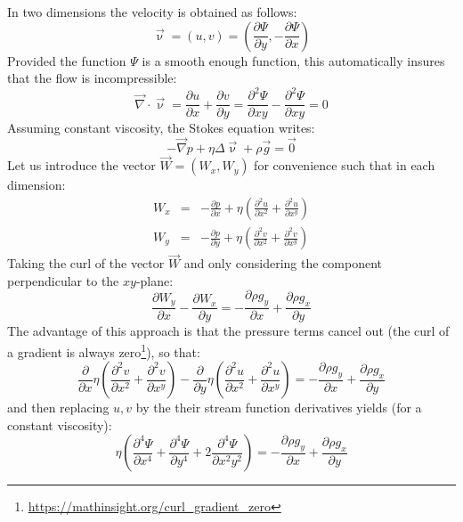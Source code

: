 In two dimensions the velocity is obtained as follows:
\begin{equation}
{\vec \upnu} = (u,v) = \left( \frac{\partial \Psi}{\partial y},-\frac{\partial \Psi}{\partial x} \right) 
\end{equation}
Provided the function $\Psi$ is a smooth enough function, 
this automatically insures that the flow is incompressible:
\begin{equation}
{\vec \nabla}\cdot {\vec \upnu} = 
\frac{\partial u}{\partial x} + \frac{\partial v}{\partial y}
=
\frac{\partial^2 \Psi}{\partial xy} - \frac{\partial^2 \Psi}{\partial xy} =0 
\end{equation}
Assuming constant viscosity, the Stokes equation writes:
\begin{equation}
-{\vec \nabla}p + \eta \Delta {\vec \upnu} + \rho {\vec g} = \vec{0}
\end{equation}
Let us introduce the vector $\vec{W}=(W_x,W_y)$ for convenience such that in each dimension:
\begin{eqnarray}
W_x&=&-\frac{\partial p}{\partial x} 
+ \eta\left( \frac{\partial^2 u}{\partial x^2} + \frac{\partial^2 u}{\partial x^y} \right) \\
W_y&=&-\frac{\partial p}{\partial y} 
+ \eta \left(\frac{\partial^2 v}{\partial x^2} + \frac{\partial^2 v}{\partial x^y} \right) 
\end{eqnarray}
Taking the curl of the vector ${\vec{W}}$ and only considering the component 
perpendicular to the $xy$-plane:
\begin{equation}
\frac{\partial W_y}{\partial x} - \frac{\partial W_x}{\partial y}  = 
-\frac{\partial \rho g_y}{\partial x} + \frac{\partial \rho g_x}{\partial y}   
\end{equation}
The advantage of this approach is that the pressure terms cancel out 
(the curl of a gradient is always zero\footnote{\url{https://mathinsight.org/curl_gradient_zero}}), 
so that:
\begin{equation}
\frac{\partial}{\partial x}\eta\left( \frac{\partial^2 v}{\partial x^2} + \frac{\partial^2 v}{\partial x^y}  \right) 
- \frac{\partial }{\partial y} \eta \left( \frac{\partial^2 u}{\partial x^2} + \frac{\partial^2 u}{\partial x^y} \right) = 
-\frac{\partial \rho g_y}{\partial x} + \frac{\partial \rho g_x}{\partial y}   
\end{equation}
and then replacing $u,v$ by the their stream function derivatives yields (for a constant viscosity):
\begin{equation}
\eta \left(\frac{\partial^4 \Psi}{\partial x^4} + 
\frac{\partial^4 \Psi}{\partial y^4} + 
2\frac{\partial^4 \Psi}{\partial x^2y^2} \right)
=
-\frac{\partial \rho g_y}{\partial x} + \frac{\partial \rho g_x}{\partial y}   
\end{equation}
